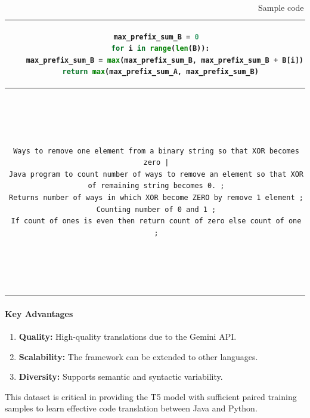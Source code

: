 \documentclass{dhbenelux}
\begin{document}
\begin{table}[h!]
{\begin{tabular}{|c|c|c|}
\begin{minipage}[t]{0.3\textwidth}
\begin{lstlisting}[language=Python, basicstyle=\ttfamily\scriptsize, breaklines=true]
  max_prefix_sum_B = 0
  for i in range(len(B)):
    max_prefix_sum_B = max(max_prefix_sum_B, max_prefix_sum_B + B[i])
  return max(max_prefix_sum_A, max_prefix_sum_B)
\end{lstlisting}
\end{minipage}
\\
\hline
\begin{minipage}[t]{0.3\textwidth}
\begin{lstlisting}[basicstyle=\ttfamily\scriptsize, breaklines=true]
Ways to remove one element from a binary string so that XOR becomes zero |
Java program to count number of ways to remove an element so that XOR of remaining string becomes 0. ;
Returns number of ways in which XOR become ZERO by remove 1 element ;
Counting number of 0 and 1 ;
If count of ones is even then return count of zero else count of one ;
\end{lstlisting}
\end{minipage}
&
\begin{minipage}[t]{0.3\textwidth}
\begin{lstlisting}[language=Java, basicstyle=\ttfamily\scriptsize, breaklines=true]
public static int countWays(String str) {
    int count0 = 0;
    int count1 = 0;
    for (int i = 0; i < str.length(); i++) {
      if (str.charAt(i) == '0') {
        count0++;
      } else {
        count1++;
      }
    }
    if (count1 % 2 == 0) {
      return count0;
    } else {
      return count1;
    }
  }
\end{lstlisting}
\end{minipage}
&
\begin{minipage}[t]{0.3\textwidth}
\begin{lstlisting}[language=Python, basicstyle=\ttfamily\scriptsize, breaklines=true]
def count_ways(s):
  count_zero = s.count('0')
  count_one = s.count('1')
  if count_one % 2 == 0:
    return count_zero
  else:
    return count_one
\end{lstlisting}
\end{minipage}
\\
\hline
\end{tabular}
}
\caption{Sample code snippets in a table}
\end{table}

\paragraph{Key Advantages}
\begin{enumerate}
    \item \textbf{Quality:} High-quality translations due to the Gemini API.
    \item \textbf{Scalability:} The framework can be extended to other languages.
    \item \textbf{Diversity:} Supports semantic and syntactic variability.
\end{enumerate}

This dataset is critical in providing the T5 model with sufficient paired training samples to learn effective code translation between Java and Python.




%
%
%
%
%
\end{document}
